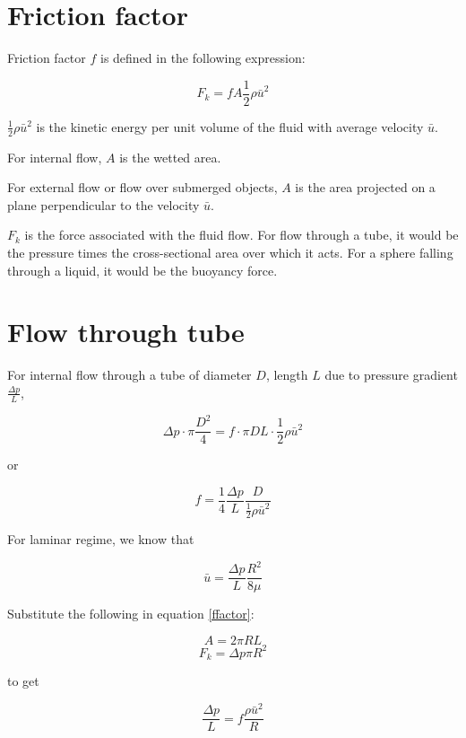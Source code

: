 \section{Friction factor}

Friction factor $f$ is defined in the following expression:

\begin{equation}
\boxed{
   F_k = f A \frac{1}{2} \rho \bar{u}^2
}
\label{ffactor}
\end{equation}

$\frac{1}{2} \rho \bar{u}^2$ is the kinetic energy per unit volume of the fluid with average velocity $\bar{u}$.

For internal flow, $A$ is the wetted area.

For external flow or flow over submerged objects, $A$ is the area projected on a plane perpendicular to the velocity $\bar{u}$.

$F_k$ is the force associated with the fluid flow. For flow through a tube, it would be the pressure times the cross-sectional area over which it acts. For a sphere falling through a liquid, it would be the buoyancy force.

\section{Flow through tube}

For internal flow through a tube of diameter $D$, length $L$ due to pressure gradient $\frac{\Delta p}{L}$,

$$ \Delta p \cdot \pi \frac{D^2}{4} = f \cdot \pi D L \cdot \frac{1}{2}\rho \bar{u}^2 $$

or

\begin{equation}
   f = \frac{1}{4} \frac{\Delta p}{L} \frac{D}{\frac{1}{2} \rho \bar{u}^2}
\label{ffactori}
\end{equation}

For laminar regime, we know that 

$$ \bar{u} = \frac{\Delta p}{L} \frac{R^2}{8\mu} $$

Substitute the following in equation \ref{ffactor}:

$$ A = 2 \pi R L$$
$$ F_k = \Delta p \pi R^2 $$

to get

\begin{equation}
\boxed{
\frac{\Delta p}{L} = f \frac{\rho \bar{u}^2}{R}
}
\end{equation}

